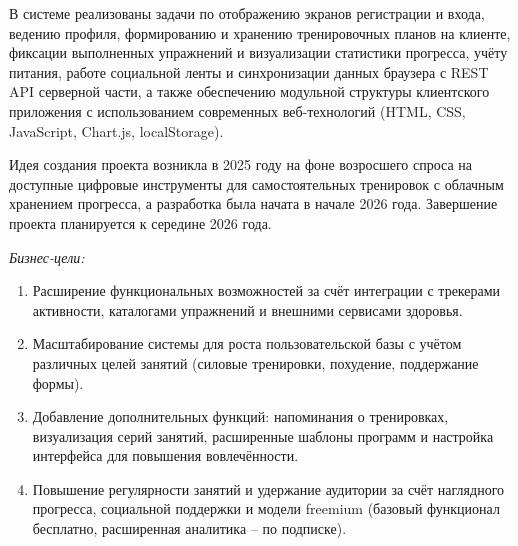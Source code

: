 В системе реализованы задачи по отображению экранов регистрации и входа, ведению профиля, формированию и хранению тренировочных планов на клиенте, фиксации выполненных упражнений и визуализации статистики прогресса, учёту питания, работе социальной ленты и синхронизации данных браузера с REST API серверной части, а также обеспечению модульной структуры клиентского приложения с использованием современных веб-технологий (HTML, CSS, JavaScript, Chart.js, localStorage).

Идея создания проекта возникла в 2025 году на фоне возросшего спроса на доступные цифровые инструменты для самостоятельных тренировок с облачным хранением прогресса, а разработка была начата в начале 2026 года. Завершение проекта планируется к середине 2026 года.

\emph{Бизнес-цели:}
\begin{enumerate}
	\item Расширение функциональных возможностей за счёт интеграции с трекерами активности, каталогами упражнений и внешними сервисами здоровья.
	
	\item Масштабирование системы для роста пользовательской базы с учётом различных целей занятий (силовые тренировки, похудение, поддержание формы).
	
	\item Добавление дополнительных функций: напоминания о тренировках, визуализация серий занятий, расширенные шаблоны программ и настройка интерфейса для повышения вовлечённости.
	
	\item Повышение регулярности занятий и удержание аудитории за счёт наглядного прогресса, социальной поддержки и модели freemium (базовый функционал бесплатно, расширенная аналитика -- по подписке).
\end{enumerate}
